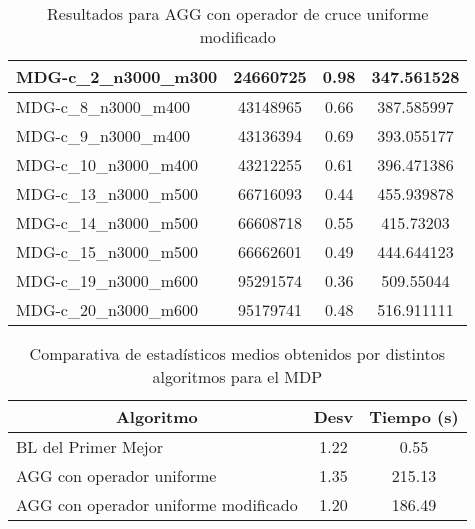 \documentclass[10pt,a4paper]{article}
\begin{document}
\begin{table}[H]
\begin{center}
\begin{tabular}{|l|c|c|c|}
					MDG-c\_2\_n3000\_m300 & 24660725 & 0.98 & 347.561528 \\ \hline
					MDG-c\_8\_n3000\_m400 & 43148965 & 0.66 & 387.585997 \\ \hline
					MDG-c\_9\_n3000\_m400 & 43136394 & 0.69 & 393.055177 \\ \hline
					MDG-c\_10\_n3000\_m400 & 43212255 & 0.61 & 396.471386 \\ \hline
					MDG-c\_13\_n3000\_m500 & 66716093 & 0.44 & 455.939878 \\ \hline
					MDG-c\_14\_n3000\_m500 & 66608718 & 0.55 & 415.73203 \\ \hline
					MDG-c\_15\_n3000\_m500 & 66662601 & 0.49 & 444.644123 \\ \hline
					MDG-c\_19\_n3000\_m600 & 95291574 & 0.36 & 509.55044 \\ \hline
					MDG-c\_20\_n3000\_m600 & 95179741 & 0.48 & 516.911111 \\ \hline
				\end{tabular}
				\caption{Resultados para AGG con operador de cruce uniforme modificado}
				\label{}
				\end{center}
			\end{table}
		
		\begin{table}[H]
			\begin{center}
				\begin{tabular}{|l|c|c|}
					\hline
					\multicolumn{1}{|c|}{\textbf{Algoritmo}} & \textbf{Desv} & \textbf{Tiempo (s)} \\ \hline
					BL del Primer Mejor & 1.22 & 0.55 \\ \hline
					AGG con operador uniforme & 1.35 & 215.13 \\ \hline
					AGG con operador uniforme modificado & 1.20 & 186.49 \\ \hline
				\end{tabular}
			\end{center}
			\caption{Comparativa de estadísticos medios obtenidos por distintos algoritmos para el MDP}
			\label{}
		\end{table}
			
\end{document}
